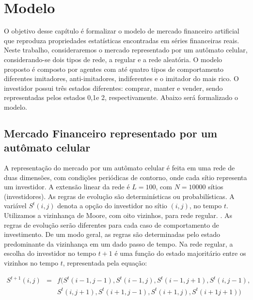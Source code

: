 \documentclass[brazil,ruledheader]{abnt}
\begin{document}
\chapter{Modelo}\label{modelo}

O objetivo desse capítulo é formalizar o modelo de mercado financeiro artificial
que reproduza propriedades estatísticas encontradas em séries financeiras reais.
Neste trabalho, consideraremos o mercado representado por um autômato celular,
considerando-se dois tipos de rede, a regular e a rede aleatória.  O modelo
proposto é composto por agentes com até quatro tipos de comportamento diferentes
imitadores, anti-imitadores, indiferentes e o imitador do mais rico. O
investidor possui três
estados diferentes: comprar, manter e vender, sendo representadas pelos
estados 0,1e 2, respectivamente. Abaixo será formalizado o modelo.

\section{Mercado Financeiro representado por um autômato celular}

A representação do mercado por um autômato celular é feita em uma rede de duas
dimensões, com condições periódicas de contorno, onde cada sítio representa um
investidor. A extensão linear da rede é $L=100$, com $N=10000$ sítios
(investidores). As regras de evolução são determinísticas ou probabilísticas. A
variável $S^t(i,j)$
denota a opção do  investidor no sítio $(i,j)$, no tempo $t$. Utilizamos a
vizinhança de Moore, com oito vizinhos, para rede regular. . As regras de
evolução serão diferentes para cada caso de comportamento de investimento. De um
modo geral, as regras são determinadas pelo estado predominante da vizinhança em
um dado passo de tempo. Na rede regular, a escolha do investidor no tempo  $t+1$
 é uma função do estado majoritário entre os vizinhos no tempo $t$, representada
pela equação: 



\begin{eqnarray}
S^{t+1}(i,j) & = & f(S^t(i-1,j-1),S^t(i-1,j),S^t(i-1,j+1),S^t(i,j-1),\nonumber
\\
& & S^t(i,j+1),S^t(i+ 1,j-1),S^t(i+1,j),S^t(i+1j+1))
\end{eqnarray}
\end{document}
